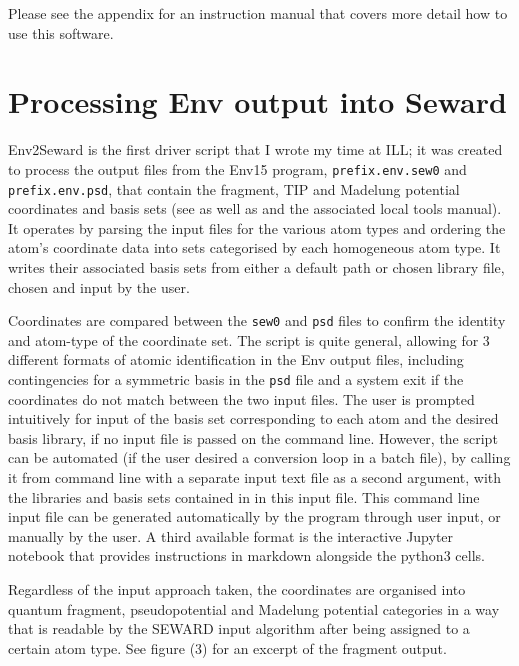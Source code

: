 \documentclass[10pt]{article}
\begin{document}
Please see the appendix for an instruction manual that covers more detail how to use this software.

\section{Processing Env output into Seward}
Env2Seward is the first driver script that I wrote my time at ILL; it was created to process the output files from the Env15 program, \texttt{prefix.env.sew0} and \texttt{prefix.env.psd}, that contain the fragment, TIP and Madelung potential coordinates and basis sets (see \cite{varignon2013ab} as well as \cite{gelle2008fast} and the associated local tools manual). It operates by parsing the input files for the various atom types and ordering the atom's coordinate data into sets categorised by each homogeneous atom type. It writes their associated basis sets from either a default path or chosen library file, chosen and input by the user.

Coordinates are compared between the \texttt{sew0} and \texttt{psd} files to confirm the identity and atom-type of the coordinate set. The script is quite general, allowing for 3 different formats of atomic identification in the Env output files, including contingencies for a symmetric basis in the \texttt{psd} file and a system exit if the coordinates do not match between the two input files. The user is prompted intuitively for input of the basis set corresponding to each atom and the desired basis library, if no input file is passed on the command line. However, the script can be automated (if the user desired a conversion loop in a batch file), by calling it from command line with a separate input text file as a second argument, with the libraries and basis sets contained in in this input file. This command line input file can be generated automatically by the program through user input, or manually by the user. A third available format is the interactive Jupyter notebook that provides instructions in markdown alongside the python3 cells.

Regardless of the input approach taken, the coordinates are organised into quantum fragment, pseudopotential and Madelung potential categories in a way that is readable by the SEWARD input algorithm after being assigned to a certain atom type. See figure (3) for an excerpt of the fragment output.
\end{document}
